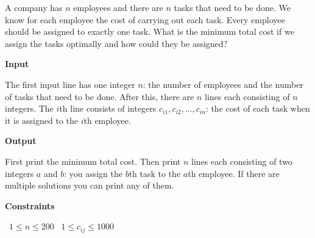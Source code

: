 A company has $n$ employees and there are $n$ tasks that need to be done. We know for each employee the cost of carrying out each task. Every employee should be assigned to exactly one task. What is the minimum total cost if we assign the tasks optimally and how could they be assigned?

\vspace{0.3cm}\noindent\textbf{Input}

The first input line has one integer $n$: the number of employees and the number of tasks that need to be done.
After this, there are $n$ lines each consisting of $n$ integers. The $i$th line consists of integers $c_{i1},c_{i2},\ldots,c_{in}$: the cost of each task when it is assigned to the $i$th employee.

\vspace{0.3cm}\noindent\textbf{Output}

First print the minimum total cost.
Then print $n$ lines each consisting of two integers $a$ and $b$: you assign the $b$th task to the $a$th employee.
If there are multiple solutions you can print any of them.

\vspace{0.3cm}\noindent\textbf{Constraints}

\textbullet\ $1 \le n \le 200$
\textbullet\ $1 \le c_{ij} \le 1000$